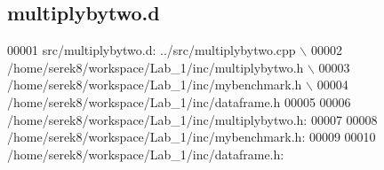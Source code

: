\hypertarget{multiplybytwo_8d}{\subsection{multiplybytwo.\-d}
\label{multiplybytwo_8d}
}

\begin{DoxyCode}
00001 src/multiplybytwo.d: ../src/multiplybytwo.cpp \(\backslash\)
00002  /home/serek8/workspace/Lab\_1/inc/multiplybytwo.h \(\backslash\)
00003  /home/serek8/workspace/Lab\_1/inc/mybenchmark.h \(\backslash\)
00004  /home/serek8/workspace/Lab\_1/inc/dataframe.h
00005 
00006 /home/serek8/workspace/Lab\_1/inc/multiplybytwo.h:
00007 
00008 /home/serek8/workspace/Lab\_1/inc/mybenchmark.h:
00009 
00010 /home/serek8/workspace/Lab\_1/inc/dataframe.h:
\end{DoxyCode}
